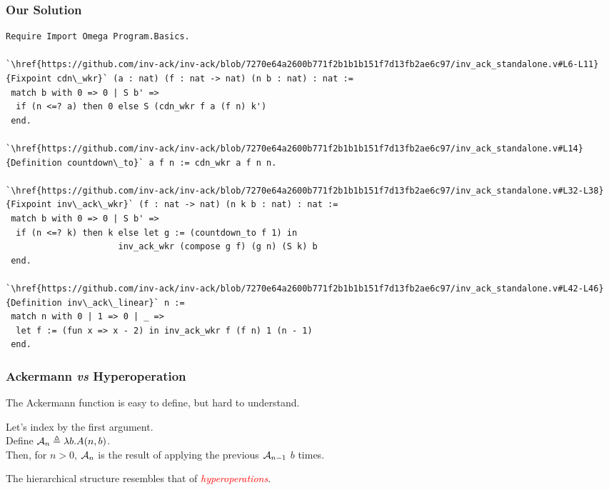 \begin{frame}[fragile]
\frametitle{Our Solution}

\vspace{-1em}
\lstset{style=myTinyStyle}
\begin{mdframed}[backgroundcolor=lightgray, roundcorner=10pt,leftmargin=0, rightmargin=0, innerleftmargin=0, innertopmargin=-5,innerbottommargin=-5, outerlinewidth=0, linecolor=lightgray]
\begin{lstlisting}
Require Import Omega Program.Basics.

`\href{https://github.com/inv-ack/inv-ack/blob/7270e64a2600b771f2b1b1b151f7d13fb2ae6c97/inv_ack_standalone.v#L6-L11}{Fixpoint cdn\_wkr}` (a : nat) (f : nat -> nat) (n b : nat) : nat :=
 match b with 0 => 0 | S b' =>
  if (n <=? a) then 0 else S (cdn_wkr f a (f n) k')
 end.

`\href{https://github.com/inv-ack/inv-ack/blob/7270e64a2600b771f2b1b1b151f7d13fb2ae6c97/inv_ack_standalone.v#L14}{Definition countdown\_to}` a f n := cdn_wkr a f n n.

`\href{https://github.com/inv-ack/inv-ack/blob/7270e64a2600b771f2b1b1b151f7d13fb2ae6c97/inv_ack_standalone.v#L32-L38} {Fixpoint inv\_ack\_wkr}` (f : nat -> nat) (n k b : nat) : nat :=
 match b with 0 => 0 | S b' =>
  if (n <=? k) then k else let g := (countdown_to f 1) in
                      inv_ack_wkr (compose g f) (g n) (S k) b
 end.

`\href{https://github.com/inv-ack/inv-ack/blob/7270e64a2600b771f2b1b1b151f7d13fb2ae6c97/inv_ack_standalone.v#L42-L46}{Definition inv\_ack\_linear}` n :=
 match n with 0 | 1 => 0 | _ => 
  let f := (fun x => x - 2) in inv_ack_wkr f (f n) 1 (n - 1)
 end.
\end{lstlisting}
\end{mdframed} 
\end{frame}


\begin{frame}
\frametitle{Ackermann \emph{vs} Hyperoperation}

The Ackermann function is easy to define, but hard to
understand.

\bigskip

\pause 	
Let's index by the first argument. \\ \smallskip
Define $\mathcal{A}_n \triangleq \lambda b.A(n,b)$. \\ \smallskip
Then, for $n>0$, $\mathcal{A}_n$ is the result of applying the previous $\mathcal{A}_{n-1}$ $b$ times.


\bigskip

\pause 
The hierarchical structure resembles that of \textcolor{red}{\emph{hyperoperations}}.

\end{frame}



